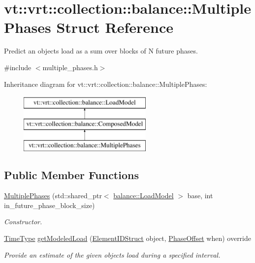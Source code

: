 \hypertarget{structvt_1_1vrt_1_1collection_1_1balance_1_1_multiple_phases}{}\section{vt\+:\+:vrt\+:\+:collection\+:\+:balance\+:\+:Multiple\+Phases Struct Reference}
\label{structvt_1_1vrt_1_1collection_1_1balance_1_1_multiple_phases}


Predict an object\textquotesingle{}s load as a sum over blocks of N future phases.  




{\ttfamily \#include $<$multiple\+\_\+phases.\+h$>$}

Inheritance diagram for vt\+:\+:vrt\+:\+:collection\+:\+:balance\+:\+:Multiple\+Phases\+:\begin{figure}[H]
\begin{center}
\leavevmode
\includegraphics[height=3.000000cm]{structvt_1_1vrt_1_1collection_1_1balance_1_1_multiple_phases}
\end{center}
\end{figure}
\subsection*{Public Member Functions}
\begin{DoxyCompactItemize}
\item 
\hyperlink{structvt_1_1vrt_1_1collection_1_1balance_1_1_multiple_phases_a28aba5fe005d35319e34ca8406aca936}{Multiple\+Phases} (std\+::shared\+\_\+ptr$<$ \hyperlink{structvt_1_1vrt_1_1collection_1_1balance_1_1_load_model}{balance\+::\+Load\+Model} $>$ base, int in\+\_\+future\+\_\+phase\+\_\+block\+\_\+size)
\begin{DoxyCompactList}\small\item\em Constructor. \end{DoxyCompactList}\item 
\hyperlink{namespacevt_a876a9d0cd5a952859c72de8a46881442}{Time\+Type} \hyperlink{structvt_1_1vrt_1_1collection_1_1balance_1_1_multiple_phases_a0c4afbc0bf64740673849fd490048704}{get\+Modeled\+Load} (\hyperlink{namespacevt_1_1vrt_1_1collection_1_1balance_a9f5b53fafb270212279a4757d2c4cd28}{Element\+I\+D\+Struct} object, \hyperlink{structvt_1_1vrt_1_1collection_1_1balance_1_1_phase_offset}{Phase\+Offset} when) override
\begin{DoxyCompactList}\small\item\em Provide an estimate of the given object\textquotesingle{}s load during a specified interval. \end{DoxyCompactList}\end{DoxyCompactItemize}
